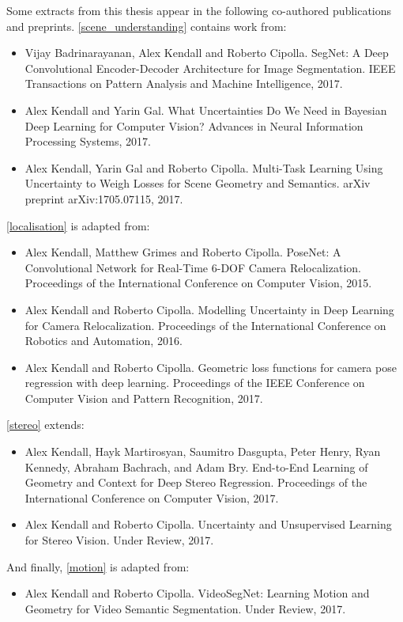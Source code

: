 Some extracts from this thesis appear in the following co-authored publications and preprints.
\cref{scene_understanding} contains work from:
\begin{itemize}
\item Vijay Badrinarayanan, Alex Kendall and Roberto Cipolla. SegNet: A Deep Convolutional Encoder-Decoder Architecture for Image Segmentation. IEEE Transactions on Pattern Analysis and Machine Intelligence, 2017.
\item Alex Kendall and Yarin Gal. What Uncertainties Do We Need in Bayesian Deep Learning for Computer Vision? Advances in Neural Information Processing Systems, 2017.
\item Alex Kendall, Yarin Gal and Roberto Cipolla. Multi-Task Learning Using Uncertainty to Weigh Losses for Scene Geometry and Semantics. arXiv preprint arXiv:1705.07115, 2017.
\end{itemize}
\cref{localisation} is adapted from:
\begin{itemize}
\item Alex Kendall, Matthew Grimes and Roberto Cipolla. PoseNet: A Convolutional Network for Real-Time 6-DOF Camera Relocalization. Proceedings of the International Conference on Computer Vision, 2015.
\item Alex Kendall and Roberto Cipolla. Modelling Uncertainty in Deep Learning for Camera Relocalization. Proceedings of the International Conference on Robotics and Automation, 2016.
\item Alex Kendall and Roberto Cipolla. Geometric loss functions for camera pose regression with deep learning. Proceedings of the IEEE Conference on Computer Vision and Pattern Recognition, 2017.
\end{itemize}
\cref{stereo} extends:
\begin{itemize}
\item Alex Kendall, Hayk Martirosyan, Saumitro Dasgupta, Peter Henry, Ryan Kennedy, Abraham Bachrach, and Adam Bry. End-to-End Learning of Geometry and Context for Deep Stereo Regression. Proceedings of the International Conference on Computer Vision, 2017.
\item Alex Kendall and Roberto Cipolla. Uncertainty and Unsupervised Learning for Stereo Vision. Under Review, 2017.
\end{itemize}
And finally, \cref{motion} is adapted from:
\begin{itemize}
\item Alex Kendall and Roberto Cipolla. VideoSegNet: Learning Motion and Geometry for Video Semantic Segmentation. Under Review, 2017.
\end{itemize}

